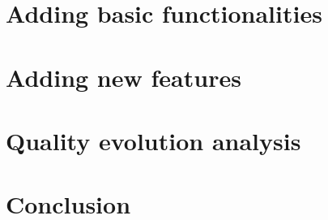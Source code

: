 \documentclass[]{article}
\begin{document}
\newpage
\section{Adding basic functionalities}
\newpage
\section{Adding new features}
\newpage
\section{Quality evolution analysis}
\newpage
\section{Conclusion}
\end{document}
